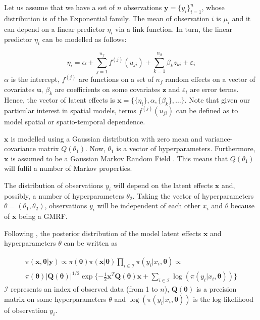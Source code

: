 \documentclass[article]{jss}
\begin{document}
Let us assume that we have a set of $n$ observations 
$\mathbf{y}=\{y_i\}_ {i=1}^n$, whose distribution is of the Exponential family.
The mean of observation $i$ is $\mu_i$ and it can depend on a linear predictor 
$\eta_i$ via a link function. In turn, the linear
predictor $\eta_i$ can be modelled as follows:

\begin{equation}
\eta_i=\alpha+\sum_{j=1}^{n_f} f^{(j)}(u_{ji})+\sum_{k=1}^{n_{\beta}}\beta_k z_{ki}+\varepsilon_i
\end{equation}
\noindent
$\alpha$ is the intercept, $f^{(j)}$ are functions on a set of $n_f$ random
effects on a vector of covariates $\mathbf{u}$, $\beta_k$ are coefficients on
some covariates $\mathbf{z}$ and $\varepsilon_i$ are error terms. Hence, the
vector of latent effects is $\mathbf{x}=\{\{\eta_i\}, \alpha, \{\beta_k\},
\ldots\}$. Note that given our particular interest in spatial models, terms
$f^{(j)}(u_{ji})$ can be defined as to model spatial or spatio-temporal
dependence.

$\mathbf{x}$ is modelled using a Gaussian distribution with zero mean and
variance-covariance matrix $Q(\theta_1)$. Now, $\theta_1$ is a vector of
hyperparameters. Furthermore, $\mathbf{x}$ is assumed to be a Gaussian Markov
Random Field \citep[GMRF,][]{rueheld:2005}. This means that  $Q(\theta_1)$ will fulfil a number of
Markov properties. 

The distribution of observations $y_i$ will depend on the latent effects
$\mathbf{x}$ and, possibly, a number of hyperparameters $\theta_2$.  Taking
the vector of hyperparameters $\theta=(\theta_1, \theta_2)$, observations
$y_i$ will be independent of each other $x_i$ and $\theta$ because
of $\mathbf{x}$ being a GMRF.

Following \citet{isi:000264374200002}, the posterior distribution of the model
latent effects $\mathbf{x}$ and hyperparameters $\theta$ can be written as 

\begin{eqnarray}
\pi(\mathbf{x}, \mathbf{\theta}|\mathbf{y}) \propto
\pi(\mathbf{\theta}) \pi(\mathbf{x}|\mathbf{\theta})\prod_{i\in \mathcal{I}}\pi(y_i|x_i,\mathbf{\theta})
\propto  \\ \nonumber
\pi(\mathbf{\theta}) |\mathbf{Q}(\mathbf{\theta})|^{1/2} \exp\{-\frac{1}{2}\mathbf{x}^T \mathbf{Q}(\mathbf{\theta}) \mathbf{x}+\sum_{i\in\mathcal{I}} \log(\pi(y_i|x_i, \mathbf{\theta})) \}
\end{eqnarray}
\noindent
$\mathcal{I}$ represents an index of observed data (from 1 to $n$),
$\mathbf{Q}(\mathbf{\theta})$ is a precision matrix on some
hyperparameters $\theta$ and $\log(\pi(y_i|x_i, \mathbf{\theta}))$ is
the log-likelihood of observation $y_i$.
\end{document}
